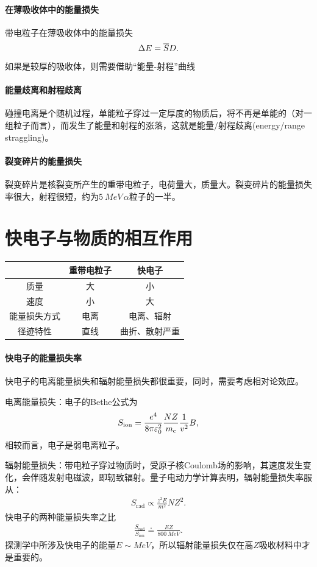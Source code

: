 \paragraph{在薄吸收体中的能量损失}
带电粒子在薄吸收体中的能量损失
\[
	\Delta E=\overline{S}D.
\]
如果是较厚的吸收体，则需要借助“能量-射程”曲线
\paragraph{能量歧离和射程歧离}
碰撞电离是个随机过程，单能粒子穿过一定厚度的物质后，将不再是单能的（对一组粒子而言），而发生了能量和射程的涨落，这就是能量/射程歧离(energy/range straggling)。
\paragraph{裂变碎片的能量损失}
裂变碎片是核裂变所产生的重带电粒子，电荷量大，质量大。裂变碎片的能量损失率很大，射程很短，约为$\SI{5}{MeV}\,\alpha$粒子的一半。

\section{快电子与物质的相互作用}

\begin{center}
	\begin{tabular}{ccc}
		\toprule
		&重带电粒子&快电子\\
		\midrule
		质量&大&小\\
		速度&小&大\\
		能量损失方式&电离&电离、辐射\\
		径迹特性&直线&曲折、散射严重\\
		\bottomrule
	\end{tabular}
\end{center}
\paragraph{快电子的能量损失率}
快电子的电离能量损失和辐射能量损失都很重要，同时，需要考虑相对论效应。

电离能量损失：电子的Bethe公式为
\begin{align}
	S_{\mathrm{ion}}=\frac{e^4}{8\pi\varepsilon_0^2}\frac{NZ}{m_\mathrm e}\frac{1}{v^2}B,
\end{align}
相较而言，电子是弱电离粒子。

辐射能量损失：带电粒子穿过物质时，受原子核Coulomb场的影响，其速度发生变化，会伴随发射电磁波，即轫致辐射。量子电动力学计算表明，辐射能量损失率服从：
\begin{align}
	S_{\mathrm{rad}}\propto\frac{z^2E}{m^2}NZ^2.
\end{align}
快电子的两种能量损失率之比
\begin{align}
	\frac{S_{\mathrm{rad}}}{S_{\mathrm{ion}}}\doteq\frac{EZ}{\SI{800}{MeV}}.
\end{align}
探测学中所涉及快电子的能量$E\sim\si{MeV}$，所以辐射能量损失仅在高$Z$吸收材料中才是重要的。

